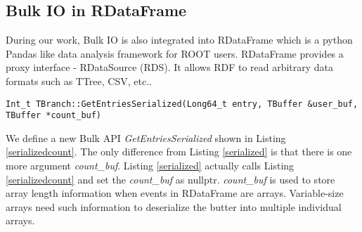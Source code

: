 \subsection{Bulk IO in RDataFrame}

During our work, Bulk IO is also integrated into RDataFrame \cite{rdataframe} which is a python Pandas \cite{pandas} like data analysis framework for ROOT users. RDataFrame provides a proxy interface - RDataSource (RDS). It allows RDF to read arbitrary data formats such as TTree, CSV, etc..

\lstset{
  basicstyle=\ttfamily,
  breaklines=true,
  xleftmargin=0.1\textwidth,
  xrightmargin=0.1\textwidth
}
\begin{lstlisting}[label={serializedcount}]
Int_t TBranch::GetEntriesSerialized(Long64_t entry, TBuffer &user_buf, TBuffer *count_buf)
\end{lstlisting}
\vspace{-10pt}


We define a new Bulk API \textit{GetEntriesSerialized} shown in Listing \ref{serializedcount}. The only difference from Listing \ref{serialized} is that there is one more argument \textit{count\_buf}. Listing \ref{serialized} actually calls Listing \ref{serializedcount} and set the \textit{count\_buf} as nullptr. \textit{count\_buf} is used to store array length information when events in RDataFrame are arrays. Variable-size arrays need such information to deserialize the butter into multiple individual arrays.